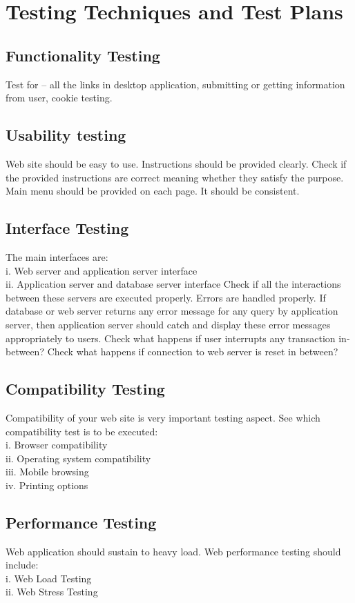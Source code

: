 	\section{Testing Techniques and Test Plans
}
\subsection{Functionality Testing}
Test for – all the links in desktop application, 
submitting or getting information from user, cookie testing.

\subsection{Usability testing}
Web site should be easy to use. Instructions should be provided clearly. Check if the provided
instructions are correct meaning whether they satisfy the purpose. Main menu should be
provided on each page. It should be consistent.

\subsection{Interface Testing}
The main interfaces are:
\\ i. Web server and application server interface
\\ ii. Application server and database server interface
Check if all the interactions between these servers are executed properly. Errors are handled
properly. If database or web server returns any error message for any query by application
server, then application server should catch and display these error messages appropriately to
users. Check what happens if user interrupts any transaction in-between? Check what happens
if connection to web server is reset in between?
\subsection{Compatibility Testing}
Compatibility of your web site is very important testing aspect. See which compatibility test is
to be executed:
\\i. Browser compatibility
\\ii. Operating system compatibility
\\iii. Mobile browsing
\\iv. Printing options
\subsection{Performance Testing}
Web application should sustain to heavy load. Web performance testing should include:
\\i. Web Load Testing
\\ii. Web Stress Testing

